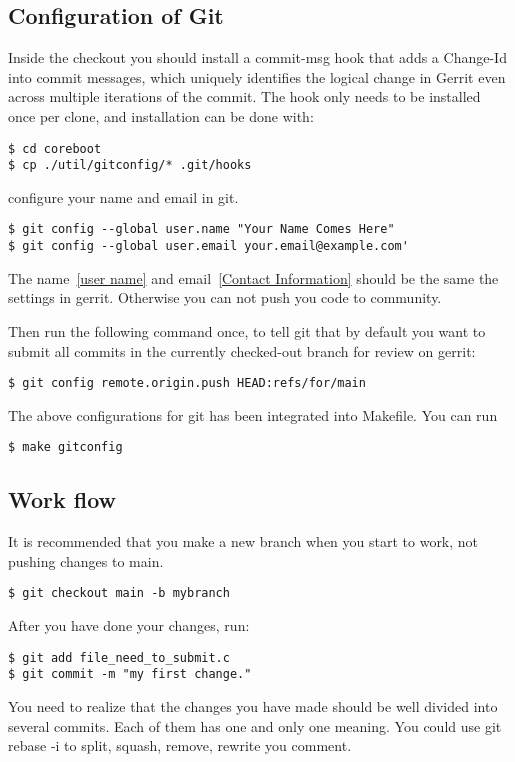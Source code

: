 \documentclass[titlepage,12pt]{article}
\begin{document}
{\subsection{Configuration of Git}
Inside the checkout you should install a commit-msg hook that adds a
Change-Id into commit messages, which uniquely identifies the logical
change in Gerrit even across multiple iterations of the commit. The
hook only needs to be installed once per clone, and installation can
be done with:
{ \small
\begin{verbatim}
$ cd coreboot
$ cp ./util/gitconfig/* .git/hooks
\end{verbatim}
}
configure your name and email in git.
{ \small
\begin{verbatim}
$ git config --global user.name "Your Name Comes Here"
$ git config --global user.email your.email@example.com'
\end{verbatim}
}
The name~\ref{user name} and email~\ref{Contact Information} should be the same the settings in gerrit.
Otherwise you can not push you code to community.

Then run the following command once, to tell git that by default you
want to submit all commits in the currently checked-out branch for
review on gerrit:
{ \small
\begin{verbatim}
$ git config remote.origin.push HEAD:refs/for/main
\end{verbatim}
}

The above configurations for git has been integrated into Makefile. You can run
{ \small
\begin{verbatim}
$ make gitconfig
\end{verbatim}
}

\subsection{Work flow}

It is recommended that you make a new branch when you start to work, not pushing changes to main.
{ \small
\begin{verbatim}
$ git checkout main -b mybranch
\end{verbatim}
}
After you have done your changes, run:
{ \small
\begin{verbatim}
$ git add file_need_to_submit.c
$ git commit -m "my first change."
\end{verbatim}
}

You need to realize that the changes you have made should be well divided into
several commits. Each of them has one and only one meaning. You could use git rebase -i to
split, squash, remove, rewrite you comment.

}
\end{document}
